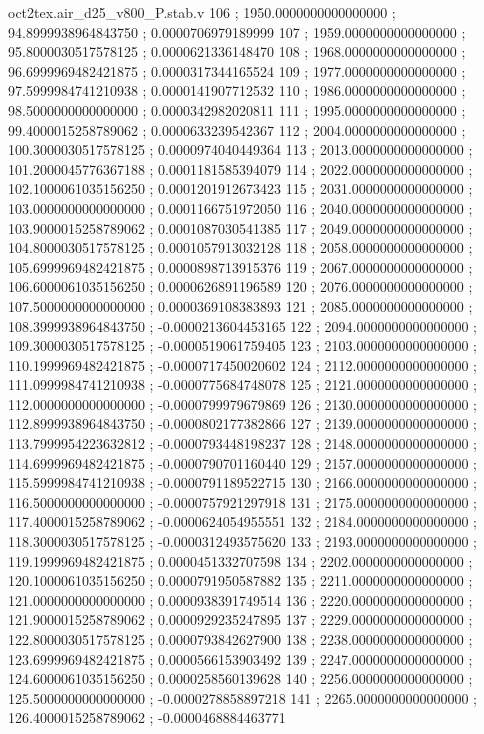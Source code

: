 \begin{filecontents}[overwrite]{oct2tex.air_d25_v800_P.stab.v}
106 ; 1950.0000000000000000 ; 94.8999938964843750 ; 0.0000706979189999
107 ; 1959.0000000000000000 ; 95.8000030517578125 ; 0.0000621336148470
108 ; 1968.0000000000000000 ; 96.6999969482421875 ; 0.0000317344165524
109 ; 1977.0000000000000000 ; 97.5999984741210938 ; 0.0000141907712532
110 ; 1986.0000000000000000 ; 98.5000000000000000 ; 0.0000342982020811
111 ; 1995.0000000000000000 ; 99.4000015258789062 ; 0.0000633239542367
112 ; 2004.0000000000000000 ; 100.3000030517578125 ; 0.0000974040449364
113 ; 2013.0000000000000000 ; 101.2000045776367188 ; 0.0001181585394079
114 ; 2022.0000000000000000 ; 102.1000061035156250 ; 0.0001201912673423
115 ; 2031.0000000000000000 ; 103.0000000000000000 ; 0.0001166751972050
116 ; 2040.0000000000000000 ; 103.9000015258789062 ; 0.0001087030541385
117 ; 2049.0000000000000000 ; 104.8000030517578125 ; 0.0001057913032128
118 ; 2058.0000000000000000 ; 105.6999969482421875 ; 0.0000898713915376
119 ; 2067.0000000000000000 ; 106.6000061035156250 ; 0.0000626891196589
120 ; 2076.0000000000000000 ; 107.5000000000000000 ; 0.0000369108383893
121 ; 2085.0000000000000000 ; 108.3999938964843750 ; -0.0000213604453165
122 ; 2094.0000000000000000 ; 109.3000030517578125 ; -0.0000519061759405
123 ; 2103.0000000000000000 ; 110.1999969482421875 ; -0.0000717450020602
124 ; 2112.0000000000000000 ; 111.0999984741210938 ; -0.0000775684748078
125 ; 2121.0000000000000000 ; 112.0000000000000000 ; -0.0000799979679869
126 ; 2130.0000000000000000 ; 112.8999938964843750 ; -0.0000802177382866
127 ; 2139.0000000000000000 ; 113.7999954223632812 ; -0.0000793448198237
128 ; 2148.0000000000000000 ; 114.6999969482421875 ; -0.0000790701160440
129 ; 2157.0000000000000000 ; 115.5999984741210938 ; -0.0000791189522715
130 ; 2166.0000000000000000 ; 116.5000000000000000 ; -0.0000757921297918
131 ; 2175.0000000000000000 ; 117.4000015258789062 ; -0.0000624054955551
132 ; 2184.0000000000000000 ; 118.3000030517578125 ; -0.0000312493575620
133 ; 2193.0000000000000000 ; 119.1999969482421875 ; 0.0000451332707598
134 ; 2202.0000000000000000 ; 120.1000061035156250 ; 0.0000791950587882
135 ; 2211.0000000000000000 ; 121.0000000000000000 ; 0.0000938391749514
136 ; 2220.0000000000000000 ; 121.9000015258789062 ; 0.0000929235247895
137 ; 2229.0000000000000000 ; 122.8000030517578125 ; 0.0000793842627900
138 ; 2238.0000000000000000 ; 123.6999969482421875 ; 0.0000566153903492
139 ; 2247.0000000000000000 ; 124.6000061035156250 ; 0.0000258560139628
140 ; 2256.0000000000000000 ; 125.5000000000000000 ; -0.0000278858897218
141 ; 2265.0000000000000000 ; 126.4000015258789062 ; -0.0000468884463771

\end{filecontents}

